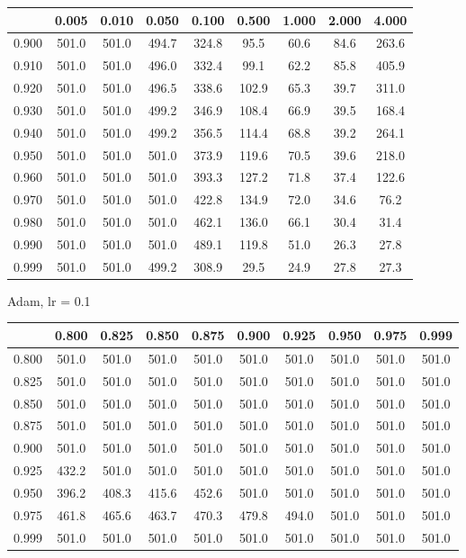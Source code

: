 \documentclass[a4paper,14pt,oneside,openany]{memoir}
\begin{document}
	\begin{tabular}{|c|c|c|c|c|c|c|c|c|}
	\hline 
	 &0.005 &0.010 &0.050 &0.100 &0.500 &1.000 &2.000 &4.000 \\
	 \hline 
	0.900 &501.0 &501.0 &494.7 &324.8 &95.5 &60.6 &84.6 &263.6 \\
	 \hline 
	0.910 &501.0 &501.0 &496.0 &332.4 &99.1 &62.2 &85.8 &405.9 \\
	 \hline 
	0.920 &501.0 &501.0 &496.5 &338.6 &102.9 &65.3 &39.7 &311.0 \\
	 \hline 
	0.930 &501.0 &501.0 &499.2 &346.9 &108.4 &66.9 &39.5 &168.4 \\
	 \hline 
	0.940 &501.0 &501.0 &499.2 &356.5 &114.4 &68.8 &39.2 &264.1 \\
	 \hline 
	0.950 &501.0 &501.0 &501.0 &373.9 &119.6 &70.5 &39.6 &218.0 \\
	 \hline 
	0.960 &501.0 &501.0 &501.0 &393.3 &127.2 &71.8 &37.4 &122.6 \\
	 \hline 
	0.970 &501.0 &501.0 &501.0 &422.8 &134.9 &72.0 &34.6 &76.2 \\
	 \hline 
	0.980 &501.0 &501.0 &501.0 &462.1 &136.0 &66.1 &30.4 &31.4 \\
	 \hline 
	0.990 &501.0 &501.0 &501.0 &489.1 &119.8 &51.0 &26.3 &27.8 \\
	 \hline 
	0.999 &501.0 &501.0 &499.2 &308.9 &29.5 &24.9 &27.8 &27.3 \\
	 \hline 
	
	\end{tabular}
	
	Adam, lr = 0.1 
	
	\begin{tabular}{|c|c|c|c|c|c|c|c|c|c|}
	\hline 
	 &0.800 &0.825 &0.850 &0.875 &0.900 &0.925 &0.950 &0.975 &0.999 \\
	 \hline 
	0.800 &501.0 &501.0 &501.0 &501.0 &501.0 &501.0 &501.0 &501.0 &501.0 \\
	 \hline 
	0.825 &501.0 &501.0 &501.0 &501.0 &501.0 &501.0 &501.0 &501.0 &501.0 \\
	 \hline 
	0.850 &501.0 &501.0 &501.0 &501.0 &501.0 &501.0 &501.0 &501.0 &501.0 \\
	 \hline 
	0.875 &501.0 &501.0 &501.0 &501.0 &501.0 &501.0 &501.0 &501.0 &501.0 \\
	 \hline 
	0.900 &501.0 &501.0 &501.0 &501.0 &501.0 &501.0 &501.0 &501.0 &501.0 \\
	 \hline 
	0.925 &432.2 &501.0 &501.0 &501.0 &501.0 &501.0 &501.0 &501.0 &501.0 \\
	 \hline 
	0.950 &396.2 &408.3 &415.6 &452.6 &501.0 &501.0 &501.0 &501.0 &501.0 \\
	 \hline 
	0.975 &461.8 &465.6 &463.7 &470.3 &479.8 &494.0 &501.0 &501.0 &501.0 \\
	 \hline 
	0.999 &501.0 &501.0 &501.0 &501.0 &501.0 &501.0 &501.0 &501.0 &501.0 \\
	 \hline 
	
	\end{tabular}
	
\end{document}
